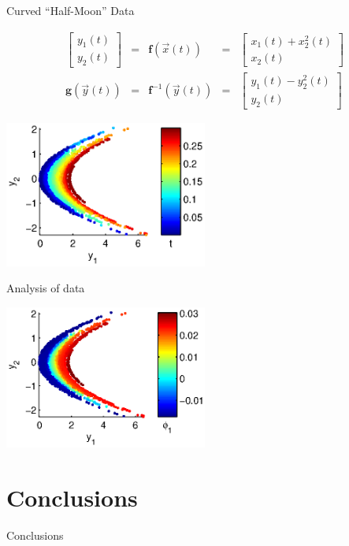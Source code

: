 \documentclass[12pt]{beamer}
\begin{document}
\begin{frame}{Curved ``Half-Moon'' Data}

\begin{equation*}
\begin{aligned}
\begin{bmatrix}
y_1(t) \\ y_2(t)
\end{bmatrix} &=&
\mathbf{f}(\vec{x}(t)) &=&
\begin{bmatrix}
x_1(t) + x_2^2(t) \\
x_2(t)
\end{bmatrix}\\
\mathbf{g}(\vec{y}(t)) &=& \mathbf{f}^{-1} (\vec{y}(t)) &=& \begin{bmatrix} y_1(t) - y_2^2(t) \\ y_2(t) \end{bmatrix}
\end{aligned}
\end{equation*}

\includegraphics[width=0.5\textwidth]{data_init_nonlinear}
\end{frame}

\begin{frame}{Analysis of data}

\includegraphics[width=0.5\textwidth]{data_nonlinear_NIV}

\end{frame}

\section{Conclusions}

\begin{frame}{Conclusions}

\end{frame}
\end{document}

